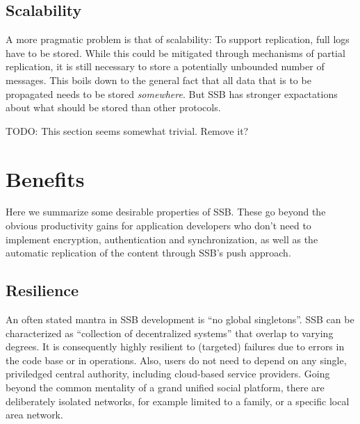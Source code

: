 \documentclass[10pt,sigconf]{acmart}
\begin{document}
\subsection{Scalability}

A more pragmatic problem is that of scalability: To support replication, full logs have to be stored. While this could be mitigated through mechanisms of partial replication, it is still necessary to store a potentially unbounded number of messages. This boils down to the general fact that all data that is to be propagated needs to be stored \textit{somewhere}. But SSB has stronger expactations about what should be stored than other protocols.

TODO: This section seems somewhat trivial. Remove it?

%
%
%
%

\section{Benefits}

Here we summarize some desirable properties of SSB. These go beyond the obvious productivity gains for application developers who don't need to implement encryption, authentication and synchronization, as well as the automatic replication of the content through SSB's push approach.

\subsection{Resilience}

An often stated mantra in SSB development is ``no global singletons''. SSB can be characterized as ``collection of decentralized systems'' that overlap to varying degrees. It is consequently highly resilient to (targeted) failures due to errors in the code base or in operations. Also, users do not need to depend on any single, priviledged central authority, including cloud-based service providers. Going beyond the common mentality of a grand unified social platform, there are deliberately isolated networks, for example limited to a family, or a specific local area network.
\end{document}
